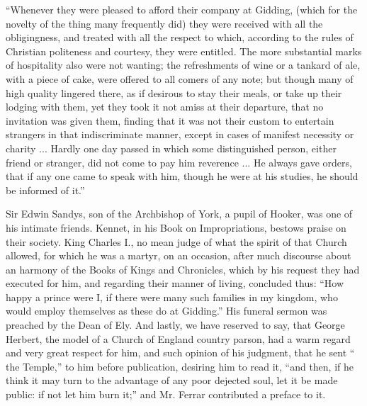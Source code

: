``Whenever they were pleased to afford their company
at Gidding, (which for the novelty of the thing many frequently did)
they were received with all the obligingness, and treated with all the
respect to which, according to the rules of Christian politeness and
courtesy, they were entitled. The more substantial marks of hospitality
also were not wanting; the refreshments of wine or a tankard of ale,
with a piece of cake, were offered to all comers of any note; but though
many of high quality lingered there, as if desirous to stay their meals,
or take up their lodging with them, yet they took it not amiss at their
departure, that no invitation was given them, finding that it was not
their custom to entertain strangers in that indiscriminate manner,
except in cases of manifest necessity or charity ... Hardly one day
passed in which some distinguished person, either friend or stranger,
did not come to pay him reverence ... He always gave orders, that if any
one came to speak with him, though he were at his studies, he should be
informed of it.''

Sir Edwin Sandys, son of the Archbishop of York, a
pupil of Hooker, was one of his intimate friends. Kennet, in his Book on
Impropriations, bestows praise on their society. King Charles I., no
mean judge of what the spirit of that Church allowed, for which he was a
martyr, on an occasion, after much discourse about an harmony of the
Books of Kings and Chronicles, which by his request they had executed
for him, and regarding their manner of living, concluded thus: ``How
happy a prince were I, if there were many such families in my kingdom,
who would employ themselves as these do at Gidding.'' His funeral sermon
was preached by the Dean of Ely. And lastly, we have reserved to say,
that George Herbert, the model of a Church of England country parson,
had a warm regard and very great respect for him, and such opinion of
his judgment, that he sent `` the Temple,'' to him before publication,
desiring him to read it, ``and then, if he think it may turn to the
advantage of any poor dejected soul, let it be made public: if not let
him burn it;'' and Mr. Ferrar contributed a preface to it.

